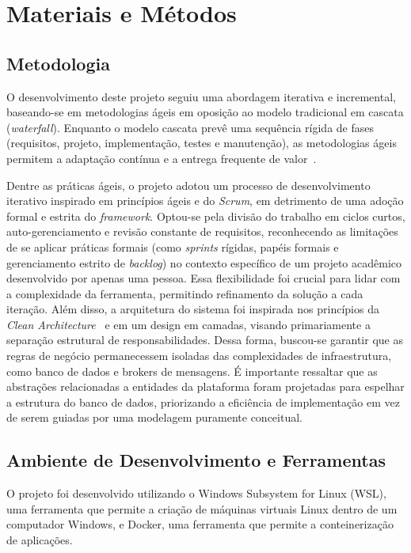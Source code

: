 \chapter{Materiais e Métodos}

\section{Metodologia}
O desenvolvimento deste projeto seguiu uma abordagem iterativa e incremental, baseando-se em metodologias ágeis em oposição ao modelo tradicional em cascata (\textit{waterfall}). Enquanto o modelo cascata prevê uma sequência rígida de fases (requisitos, projeto, implementação, testes e manutenção), as metodologias ágeis permitem a adaptação contínua e a entrega frequente de valor~\cite{sommerville2011software}.

Dentre as práticas ágeis, o projeto adotou um processo de desenvolvimento iterativo inspirado em princípios ágeis e do \textit{Scrum}, em detrimento de uma adoção formal e estrita do \textit{framework}. Optou-se pela divisão do trabalho em ciclos curtos, auto-gerenciamento e revisão constante de requisitos, reconhecendo as limitações de se aplicar práticas formais (como \textit{sprints} rígidas, papéis formais e gerenciamento estrito de \textit{backlog}) no contexto específico de um projeto acadêmico desenvolvido por apenas uma pessoa. Essa flexibilidade foi crucial para lidar com a complexidade da ferramenta, permitindo refinamento da solução a cada iteração. Além disso, a arquitetura do sistema foi inspirada nos princípios da \textit{Clean Architecture}~\cite{martin2008clean} e em um design em camadas, visando primariamente a separação estrutural de responsabilidades. Dessa forma, buscou-se garantir que as regras de negócio permanecessem isoladas das complexidades de infraestrutura, como banco de dados e brokers de mensagens. É importante ressaltar que as abstrações relacionadas a entidades da plataforma foram projetadas para espelhar a estrutura do banco de dados, priorizando a eficiência de implementação em vez de serem guiadas por uma modelagem puramente conceitual.

\section{Ambiente de Desenvolvimento e Ferramentas}
O projeto foi desenvolvido utilizando o Windows Subsystem for Linux (WSL), uma ferramenta que permite a criação de máquinas virtuais Linux dentro de um computador Windows, e Docker, uma ferramenta que permite a conteinerização de aplicações.

